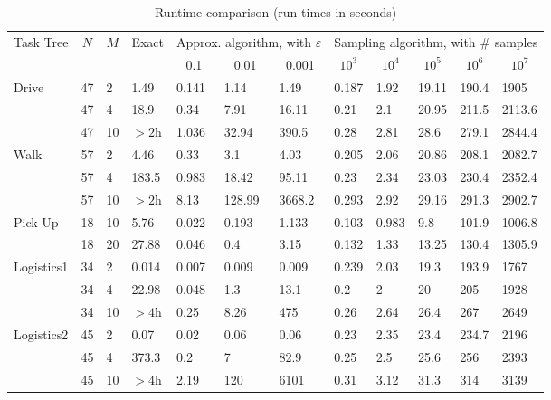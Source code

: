 \documentclass[review]{elsarticle}
\begin{document}
\begin{table}[htb!]
	{\footnotesize
		\begin{tabular}{|X{1.2cm}|l|l|l||l|l|l||X{0.65cm}|X{0.65cm}|X{0.65cm}|X{0.65cm}|X{0.8cm}|}
			\hline
			\multicolumn{1}{|c|}{\multirow{2}{*}{Task Tree}} & \multicolumn{1}{c|}{\multirow{2}{*}{$N$}} & \multicolumn{1}{c|}{\multirow{2}{*}{$M$}} & \multirow{2}{*}{Exact} & \multicolumn{3}{c|}{Approx. algorithm, with $\varepsilon$} & \multicolumn{5}{c|}{Sampling algorithm, with \# samples} \\ \cline{5-12} 
			\multicolumn{1}{|c|}{} & \multicolumn{1}{c|}{} & \multicolumn{1}{c|}{} &  & \multicolumn{1}{c|}{0.1} & \multicolumn{1}{c|}{0.01} & \multicolumn{1}{c|}{0.001} & \multicolumn{1}{c|}{$10^{3}$} & \multicolumn{1}{c|}{$10^{4}$} & \multicolumn{1}{c|}{$10^{5}$} & \multicolumn{1}{c|}{$10^{6}$} & \multicolumn{1}{c|}{$10^{7}$} \\ \hline \hline
			\multirow{2}{*}{Drive} & 47 & 2 & 1.49 & 0.141 & 1.14 & 1.49 & 0.187 & 1.92 & 19.11 & 190.4 & 1905 \\ \cline{2-12} 
			& 47 & 4 & 18.9 & 0.34 & 7.91 & 16.11 & 0.21 & 2.1 & 20.95 &  211.5 & 2113.6\\ \cline{2-12}
			& 47 & 10 & $> 2$h & 1.036 & 32.94 & 390.5 & 0.28 & 2.81 & 28.6 &279.1  &  2844.4  \\ \hline
			\multirow{2}{*}{Walk}  & 57 & 2& 4.46 & 0.33 & 3.1 & 4.03 & 0.205 & 2.06 & 20.86 & 208.1 & 2082.7  \\ \cline{2-12} 
			& 57 & 4  & 183.5 & 0.983 & 18.42 & 95.11 & 0.23 & 2.34 & 23.03 & 230.4 & 2352.4 \\ \cline{2-12} 
			& 57 & 10 & $> 2$h & 8.13 & 128.99 & 3668.2 & 0.293 & 2.92 & 29.16 & 291.3 & 2902.7 \\ \hline
			\multirow{2}{*}{Pick Up} & 18 & 10 & 5.76 & 0.022 & 0.193 & 1.133 & 0.103 & 0.983 & 9.8 & 101.9 & 1006.8 \\ \cline{2-12} 
			& 18 & 20 & 27.88 & 0.046 & 0.4 & 3.15 & 0.132 & 1.33 & 13.25 & 130.4 & 1305.9 \\ \hline
			\multirow{2}{*}{Logistics1} & 34 & 2 & 0.014 & 0.007 &  0.009 & 0.009 & 0.239 & 2.03 & 19.3 & 193.9 & 1767 \\ \cline{2-12} 
			& 34 & 4 & 22.98 & 0.048 & 1.3 & 13.1 & 0.2 &  2 & 20 & 205 &1928\\ \cline{2-12}  
			& 34 & 10 & $> 4$h & 0.25 & 8.26 & 475 & 0.26 & 2.64 & 26.4 & 267 & 2649 \\ \hline 
			\multirow{2}{*}{Logistics2} & 45 & 2 & 0.07 &  0.02 &  0.06 & 0.06 & 0.23 & 2.35 & 23.4 & 234.7 & 2196 \\ \cline{2-12} 
			& 45 & 4 & 373.3& 0.2 & 7 & 82.9 & 0.25 & 2.5 & 25.6 & 256 & 2393\\ \cline{2-12}  
			& 45 & 10 & $> 4$h & 2.19 & 120 & 6101 & 0.31 & 3.12 & 31.3 &314 & 3139\\ \hline
		\end{tabular}
		\caption{Runtime comparison (run times in seconds)}
		\label{tab:runtimes1}
	}
	
\end{table}
\end{document}
